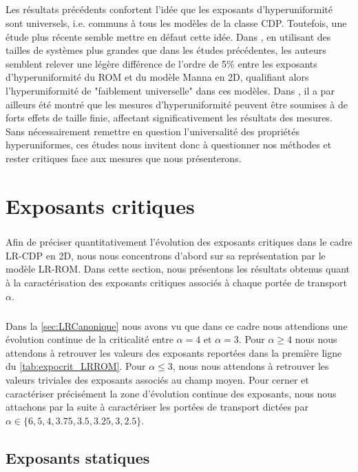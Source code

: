 \subparagraph{}Les résultats précédents confortent l'idée que les exposants d'hyperuniformité sont universels, i.e. communs à tous les modèles de la classe CDP. Toutefois, une étude plus récente semble mettre en défaut cette idée. Dans \cite{bub_lee_hyperuniformity_2019}, en utilisant des tailles de systèmes plus grandes que dans les études précédentes, les auteurs semblent relever une légère différence de l'ordre de 5\% entre les exposants d'hyperuniformité du ROM et du modèle Manna en 2D, qualifiant alors l'hyperuniformité de "faiblement universelle" dans ces modèles. Dans \cite{wiese_hyperuniformity_2024}, il a par ailleurs été montré que les mesures d'hyperuniformité peuvent être soumises à de forts effets de taille finie, affectant significativement les résultats des mesures. Sans nécessairement remettre en question l'universalité des propriétés hyperuniformes, ces études nous invitent donc à questionner nos méthodes et rester critiques face aux mesures que nous présenterons.

\section{Exposants critiques}

\subparagraph{}Afin de préciser quantitativement l'évolution des exposants critiques dans le cadre LR-CDP en 2D, nous nous concentrons d'abord sur sa représentation par le modèle LR-ROM. Dans cette section, nous présentons les résultats obtenus quant à la caractérisation des exposants critiques associés à chaque portée de transport $\alpha$.

\subparagraph{}Dans la \autoref{sec:LRCanonique} nous avons vu que dans ce cadre nous attendions une évolution continue de la criticalité entre $\alpha = 4$ et $\alpha=3$. Pour $\alpha\geq 4$ nous nous attendons à retrouver les valeurs des exposants reportées dans la première ligne du \autoref{tab:expocrit_LRROM}. Pour $\alpha\leq 3$, nous nous attendons à retrouver les valeurs triviales des exposants associés au champ moyen. Pour cerner et caractériser précisément la zone d'évolution continue des exposants, nous nous attachons par la suite à caractériser les portées de transport dictées par $\alpha \in \{ 6, 5, 4, 3.75, 3.5, 3.25, 3, 2.5  \}$.

\label{sec:expcritjumps}

\subsection{Exposants statiques}

